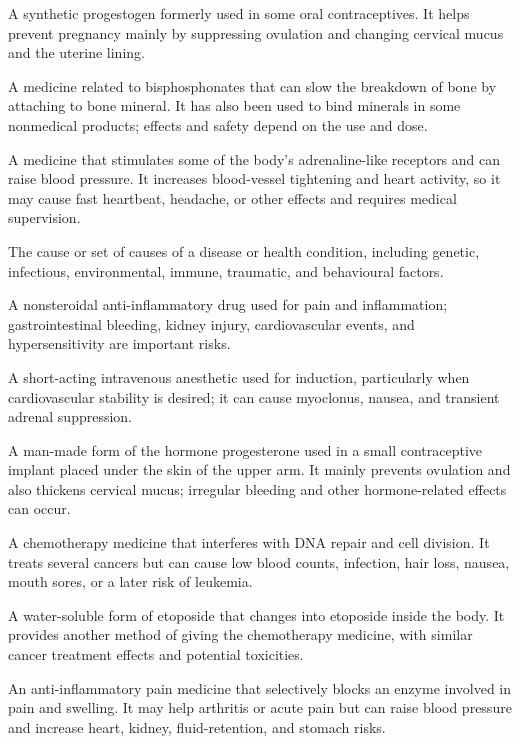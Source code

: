  A synthetic progestogen formerly used in some oral contraceptives. It helps prevent pregnancy mainly by suppressing ovulation and changing cervical mucus and the uterine lining.

 A medicine related to bisphosphonates that can slow the breakdown of bone by attaching to bone mineral. It has also been used to bind minerals in some nonmedical products; effects and safety depend on the use and dose.

 A medicine that stimulates some of the body’s adrenaline-like receptors and can raise blood pressure. It increases blood-vessel tightening and heart activity, so it may cause fast heartbeat, headache, or other effects and requires medical supervision.

 The cause or set of causes of a disease or health condition, including genetic, infectious, environmental, immune, traumatic, and behavioural factors.

 A nonsteroidal anti-inflammatory drug used for pain and inflammation; gastrointestinal bleeding, kidney injury, cardiovascular events, and hypersensitivity are important risks.

 A short-acting intravenous anesthetic used for induction, particularly when cardiovascular stability is desired; it can cause myoclonus, nausea, and transient adrenal suppression.

 A man-made form of the hormone progesterone used in a small contraceptive implant placed under the skin of the upper arm. It mainly prevents ovulation and also thickens cervical mucus; irregular bleeding and other hormone-related effects can occur.

 A chemotherapy medicine that interferes with DNA repair and cell division. It treats several cancers but can cause low blood counts, infection, hair loss, nausea, mouth sores, or a later risk of leukemia.

 A water-soluble form of etoposide that changes into etoposide inside the body. It provides another method of giving the chemotherapy medicine, with similar cancer treatment effects and potential toxicities.

 An anti-inflammatory pain medicine that selectively blocks an enzyme involved in pain and swelling. It may help arthritis or acute pain but can raise blood pressure and increase heart, kidney, fluid-retention, and stomach risks.

